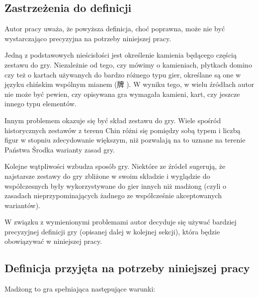 \subsection{Zastrzeżenia do definicji}
Autor pracy uważa, że powyższa definicja, choć poprawna, może nie być
wystarczająco precyzyjna na potrzeby niniejszej pracy.

Jedną z podstawowych nieścisłości jest określenie kamienia będącego częścią
zestawu do gry.
Niezależnie od tego, czy mówimy o kamieniach, płytkach domino czy też o kartach
używanych do bardzo różnego typu gier, określane są one w języku chińskim
wspólnym mianem  (牌 ). W wyniku tego, w wielu źródłach
autor nie może być pewien, czy opisywana gra wymagała kamieni, kart, czy jeszcze
innego typu elementów.

Innym problemem okazuje się być skład zestawu do gry. Wiele spośród
historycznych zestawów z terenu Chin różni się pomiędzy sobą typem i liczbą
figur w stopniu zdecydowanie większym, niż pozwalają na to uznane na terenie
Państwa Środka warianty zasad gry.

Kolejne wątpliwości wzbudza sposób gry. Niektóre ze źródeł sugerują, że
najstarsze zestawy do gry zbliżone w swoim składzie i wyglądzie do współczesnych
były wykorzystywane do gier innych niż madżong (czyli o zasadach
nieprzypominających żadnego ze współcześnie akceptowanych wariantów).

W związku z wymienionymi problemami autor decyduje się używać bardziej
precyzyjnej definicji gry (opisanej dalej w kolejnej sekcji), która będzie
obowiązywać w niniejszej pracy.
\subsection{Definicja przyjęta na potrzeby niniejszej pracy}
\label{definicja}
Madżong to gra spełniająca %
następujące warunki:

